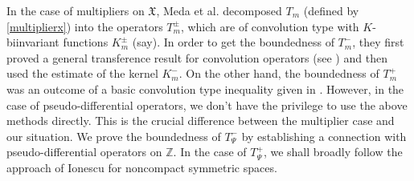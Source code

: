 \documentclass[12pt,reqno]{amsart}
\theoremstyle{definition}
\theoremstyle{definition}
\numberwithin{equation}{section}
\begin{document}
In the case of multipliers on $\mathfrak{X}$, Meda et al. \cite{Meda_Stefano_2019} decomposed $T_m$ (defined by \eqref{multiplierx}) into the operators $T_{m}^{\pm}$, which are of convolution type with $K$-biinvariant functions $ K_m^{\pm}$ (say). In order to get the boundedness of $T_{m}^{-}$, they first proved a general transference result for convolution operators (see \cite[Theorem 3.3]{Meda_Stefano_2019}) and then used the estimate of the kernel $K_{m}^{-}$. On the other hand, the boundedness of $T_{m}^{+}$ was an outcome of a basic convolution type inequality given in \cite[Corollary 20.14 (ii) $\&$ (iv)]{MR551496}. However, in the case of pseudo-differential operators, we don't have the privilege to use the above methods directly. This is the crucial difference between the multiplier case and our situation. We prove the boundedness of $T_{\Psi}^{-}$ by establishing a connection with pseudo-differential operators on $\mathbb{Z}$. In the case of $T_{\Psi}^{+}$, we shall broadly follow the approach of Ionescu \cite{Ionescu_2002} for noncompact symmetric spaces.
\end{document}
